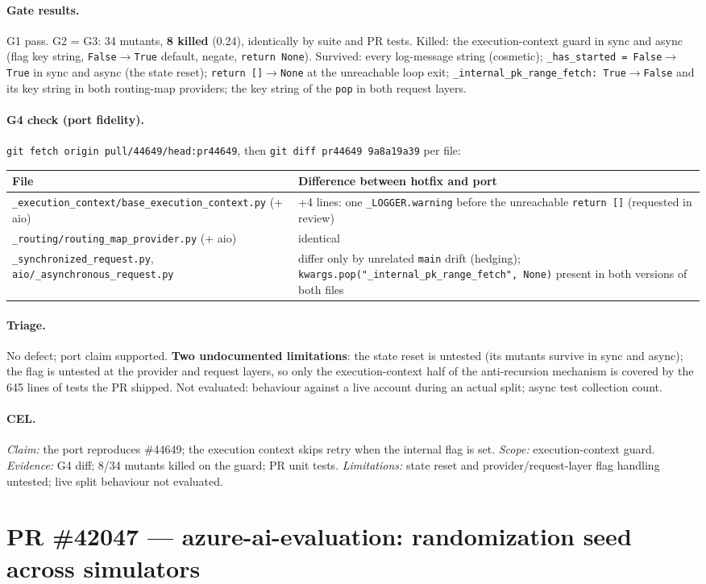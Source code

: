 \documentclass[11pt,a4paper]{article}
\newcommand{\code}[1]{\texttt{#1}}
\newcommand{\card}[1]{\clearpage\section{#1}}
\newcommand{\sub}[1]{\paragraph{#1}}
\begin{document}
\sub{Gate results.} G1 pass. G2 = G3: 34 mutants, \textbf{8 killed} (0.24), identically by suite and PR tests. Killed: the execution-context guard in sync and async (flag key string, \code{False$\to$True} default, negate, \code{return None}). Survived: every log-message string (cosmetic); \code{\_has\_started = False$\to$True} in sync and async (the state reset); \code{return []$\to$None} at the unreachable loop exit; \code{\_internal\_pk\_range\_fetch: True$\to$False} and its key string in both routing-map providers; the key string of the \code{pop} in both request layers.

\sub{G4 check (port fidelity).} \code{git fetch origin pull/44649/head:pr44649}, then \code{git diff pr44649 9a8a19a39} per file:
\begin{center}\small\begin{tabularx}{\textwidth}{X X}
\toprule File & Difference between hotfix and port \\ \midrule
\code{\_execution\_context/base\_execution\_context.py} (+ aio) & +4 lines: one \code{\_LOGGER.warning} before the unreachable \code{return []} (requested in review) \\
\code{\_routing/routing\_map\_provider.py} (+ aio) & identical \\
\code{\_synchronized\_request.py}, \code{aio/\_asynchronous\_request.py} & differ only by unrelated \code{main} drift (hedging); \code{kwargs.pop("\_internal\_pk\_range\_fetch", None)} present in both versions of both files \\
\bottomrule\end{tabularx}\end{center}

\sub{Triage.} No defect; port claim supported. \textbf{Two undocumented limitations}: the state reset is untested (its mutants survive in sync and async); the flag is untested at the provider and request layers, so only the execution-context half of the anti-recursion mechanism is covered by the 645 lines of tests the PR shipped. Not evaluated: behaviour against a live account during an actual split; async test collection count.

\sub{CEL.} \emph{Claim:} the port reproduces \#44649; the execution context skips retry when the internal flag is set. \emph{Scope:} execution-context guard. \emph{Evidence:} G4 diff; 8/34 mutants killed on the guard; PR unit tests. \emph{Limitations:} state reset and provider/request-layer flag handling untested; live split behaviour not evaluated.

\card{PR \#42047 — azure-ai-evaluation: randomization seed across simulators}
\end{document}
